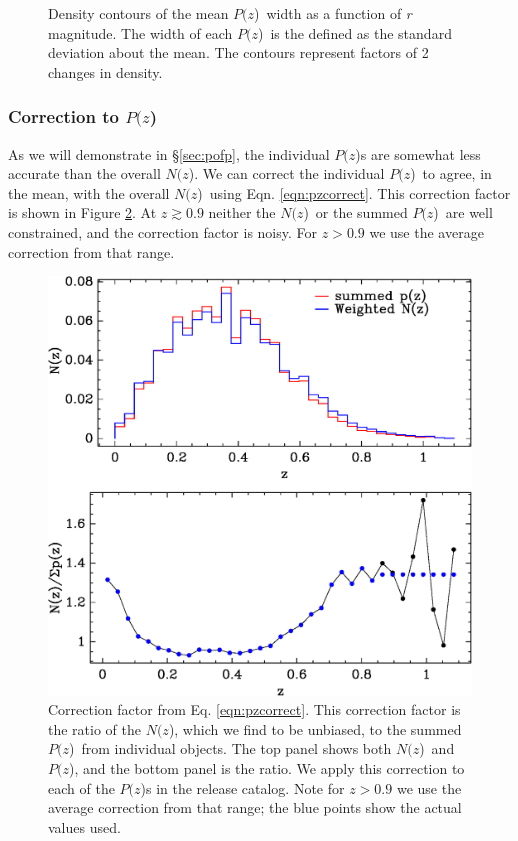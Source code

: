 \documentclass[12pt,preprint]{aastex}
\newcommand{\pofz}{$P(z$)}
\newcommand{\nofz}{$N(z$)}
\begin{document}
\begin{figure}[p]\centering
    \caption{Density contours of the mean \pofz\ width as a function of {\it r} magnitude. 
The width of each \pofz\ is the defined as the standard deviation about the mean. 
The contours represent factors of 2 changes in density.}
    \label{fig:pzwidth}
    \vspace{2em}
\end{figure}

\subsubsection{Correction to \pofz} \label{sec:pzcorr}

As we will demonstrate in \S \ref{sec:pofp}, the individual \pofz s are
somewhat less accurate than the overall \nofz.  We can correct the individual
\pofz\ to agree, in the mean, with the overall \nofz\ using Eqn.
\ref{eqn:pzcorrect}.  This correction factor is shown in Figure
\ref{fig:pzcorr}.  At $z \gtrsim 0.9$ neither the \nofz\ or the summed
\pofz\ are well constrained, and the correction factor is noisy.  For $z > 0.9$
we use the average correction from that range.

\begin{figure}[t]\centering
    \includegraphics[scale=0.6]{figures/pofz-correct-12.eps}

    \caption{Correction factor from Eq. \ref{eqn:pzcorrect}.  This correction
    factor is the ratio of the \nofz, which we find to be unbiased, to the summed
    \pofz\ from individual objects. The top panel shows both \nofz\ and \pofz,
    and the bottom panel is the ratio.  We apply this correction to each of the
    \pofz s in the release catalog.  Note for $z > 0.9$ we use the average
    correction from that range; the blue points show the actual
    values used.}

    \label{fig:pzcorr}
    \vspace{2em}
\end{figure}
\end{document}
